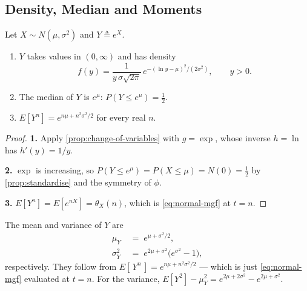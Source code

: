 \subsection{Density, Median and Moments}

Let $X\sim N(\mu,\sigma^{2})$ and $Y\triangleq e^{X}$.

\suppstart
\begin{proposition}\label{prop:lognormal-basic}
	\begin{enumerate}[nosep]
		\item $Y$ takes values in $(0,\infty)$ and has density
		      \[
			      f(y)=\frac{1}{y\,\sigma\sqrt{2\pi}}\,e^{-(\ln y-\mu)^{2}/(2\sigma^{2})} ,
			      \qquad y>0 .
		      \]
		\item The median of $Y$ is $e^{\mu}$: $P(Y\le e^{\mu})=\tfrac12$.
		\item $E[Y^{n}]=e^{n\mu+n^{2}\sigma^{2}/2}$ for every real $n$.
	\end{enumerate}
\end{proposition}

\begin{proof}
	\textbf{1.} Apply \autoref{prop:change-of-variables} with $g=\exp$, whose inverse $h=\ln$ has $h'(y)=1/y$.

	\textbf{2.} $\exp$ is increasing, so $P(Y\le e^{\mu})=P(X\le\mu)=N(0)=\tfrac12$ by \autoref{prop:standardise} and the symmetry of $\phi$.

	\textbf{3.} $E[Y^{n}]=E[e^{nX}]=\theta_{X}(n)$, which is \eqref{eq:normal-mgf} at $t=n$.
\end{proof}
\suppend

The mean and variance of $Y$ are
\begin{equation}
	\begin{aligned}
		\mu_{Y}      & \;=\; e^{\mu+\sigma^{2}/2} ,                          \\
		\sigma_{Y}^{2} & \;=\; e^{2\mu+\sigma^{2}}\bigl(e^{\sigma^{2}}-1\bigr) ,
	\end{aligned}\label{eq:lognormal-moments}
\end{equation}
respectively.
They follow from $E[\,Y^{n}\,]=e^{n\mu+n^{2}\sigma^{2}/2}$ --- which is just \eqref{eq:normal-mgf} evaluated at $t=n$.
For the variance, $E[Y^{2}]-\mu_{Y}^{2}=e^{2\mu+2\sigma^{2}}-e^{2\mu+\sigma^{2}}$.

